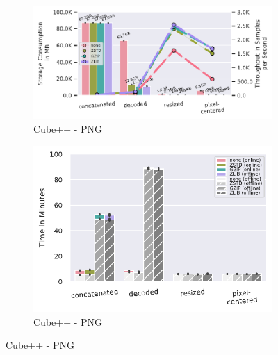 \documentclass[sigconf,nonacm]{acmart}
\begin{document}
\begin{figure}[b]
  \begin{subfigure}{0.49 \columnwidth}
    \includegraphics[width=\linewidth]{../images/cubeplusplus-png-pipeline/compressed-storage-vs-throughput.pdf}
    \caption{Cube++ - PNG}
    \Description{}
    \label{fig:zstd-cpp-png-compressed-storage-vs-throughput}
  \end{subfigure}
  \hfill %
  \begin{subfigure}{0.49 \columnwidth}
    \includegraphics[width=\linewidth]{../images/cubeplusplus-png-pipeline/compression-processing-time-split.pdf}
    \caption{Cube++ - PNG}
    \Description{}
    \label{fig:zstd-cpp-png-compression-processing-time-split}
  \end{subfigure}
  

\end{figure}
\end{document}
